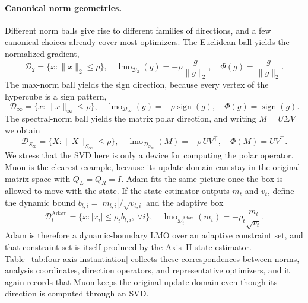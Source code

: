 \paragraph{Canonical norm geometries.}
Different norm balls give rise to different families of directions, and a few canonical choices already cover most optimizers. The Euclidean ball yields the normalized gradient,
\begin{equation}
  \mathcal{D}_2=\{x:\|x\|_2\le\rho\},
  \quad
  \operatorname{lmo}_{\mathcal{D}_2}(g)=-\rho\frac{g}{\|g\|_2},
  \quad
  \Phi(g)=\frac{g}{\|g\|_2}.
  \label{eq:lmo-euclidean}
\end{equation}
The max-norm ball yields the sign direction, because every vertex of the hypercube is a sign pattern,
\begin{equation}
  \mathcal{D}_\infty=\{x:\|x\|_\infty\le\rho\},
  \quad
  \operatorname{lmo}_{\mathcal{D}_\infty}(g)=-\rho\operatorname{sign}(g),
  \quad
  \Phi(g)=\operatorname{sign}(g).
  \label{eq:lmo-signball}
\end{equation}
The spectral-norm ball yields the matrix polar direction, and writing $M=U\Sigma V^\top$ we obtain
\begin{equation}
  \mathcal{D}_{S_\infty}=\{X:\|X\|_{S_\infty}\le\rho\},
  \quad
  \operatorname{lmo}_{\mathcal{D}_{S_\infty}}(M)=-\rho\,UV^\top,
  \quad
  \Phi(M)=UV^\top.
  \label{eq:lmo-spectral}
\end{equation}
We stress that the SVD here is only a device for computing the polar operator. Muon is the clearest example, because its update domain can stay in the original matrix space with $Q_L=Q_R=I$. Adam fits the same picture once the box is allowed to move with the state. If the state estimator outputs $m_t$ and $v_t$, define the dynamic bound $b_{t,i}=|m_{t,i}|/\sqrt{v_{t,i}}$ and the adaptive box
\begin{equation}
  \mathcal{D}_t^{\operatorname{Adam}}=\{x:|x_i|\le\rho_t b_{t,i},\ \forall i\},
  \quad
  \operatorname{lmo}_{\mathcal{D}_t^{\operatorname{Adam}}}(m_t)=-\rho_t\frac{m_t}{\sqrt{v_t}} .
  \label{eq:lmo-adam-box}
\end{equation}
Adam is therefore a dynamic-boundary LMO over an adaptive constraint set, and that constraint set is itself produced by the Axis~II state estimator. Table~\ref{tab:four-axis-instantiation} collects these correspondences between norms, analysis coordinates, direction operators, and representative optimizers, and it again records that Muon keeps the original update domain even though its direction is computed through an SVD.

